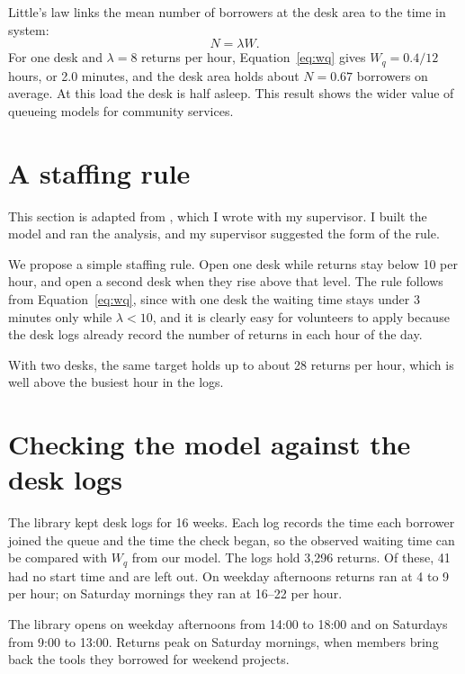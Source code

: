 Little's law links the mean number of borrowers at the desk area to the time in system:
\begin{equation}
  N = \lambda W.
  \label{eq:little}
\end{equation}
For one desk and $\lambda = 8$ returns per hour, Equation~\eqref{eq:wq} gives $W_q = 0.4/12$ hours, or 2.0 minutes, and the desk area holds about $N = 0.67$ borrowers on average.
At this load the desk is half asleep.
This result shows the wider value of queueing models for community services.

\section{A staffing rule}
\label{sec:rule}

This section is adapted from \cite{writer2025}, which I wrote with my supervisor.
I built the model and ran the analysis, and my supervisor suggested the form of the rule.

We propose a simple staffing rule.
Open one desk while returns stay below 10 per hour, and open a second desk when they rise above that level.
The rule follows from Equation~\eqref{eq:wq}, since with one desk the waiting time stays under 3 minutes only while $\lambda < 10$, and it is clearly easy for volunteers to apply because the desk logs already record the number of returns in each hour of the day.

With two desks, the same target holds up to about 28 returns per hour, which is well above the busiest hour in the logs.

\section{Checking the model against the desk logs}
\label{sec:logs}

The library kept desk logs for 16 weeks.
Each log records the time each borrower joined the queue and the time the check began, so the observed waiting time can be compared with $W_q$ from our model.
The logs hold 3,296 returns. Of these, 41 had no start time and are left out.
On weekday afternoons returns ran at 4 to 9 per hour; on Saturday mornings they ran at 16--22 per hour.

The library opens on weekday afternoons from 14:00 to 18:00 and on Saturdays from 9:00 to 13:00.
Returns peak on Saturday mornings, when members bring back the tools they borrowed for weekend projects.

